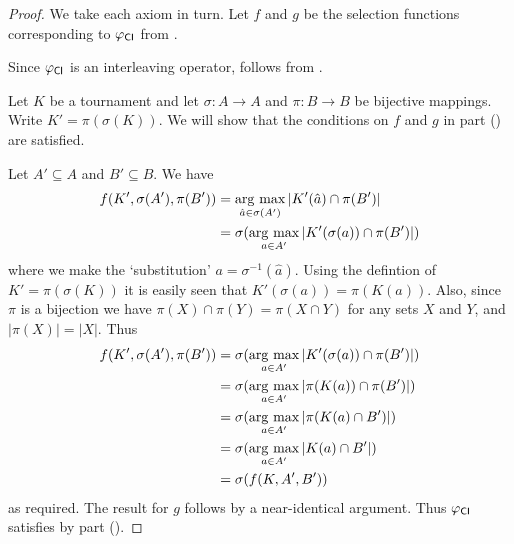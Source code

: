 \begin{proof}

    We take each axiom in turn. Let $f$ and $g$ be the selection functions
    corresponding to ${\varphi_{\mathsf{CI}}}$ from .

     Since ${\varphi_{\mathsf{CI}}}$ is an interleaving operator,
     follows from .

     Let $K$ be a tournament and let $\sigma: A \to A$ and $\pi:
    B \to B$ be bijective mappings. Write $K' = \pi(\sigma(K))$. We will show
    that the conditions on $f$ and $g$ in
     part
    () are satisfied.

    Let $A' \subseteq A$ and $B' \subseteq B$. We have
    \begin{align*}
        f(K', \sigma(A'), \pi(B'))
        &= \operatorname*{arg\ max}_{\hat{a} \in \sigma(A')}{|K'(\hat{a}) \cap \pi(B')|} \\
        &= \sigma(\operatorname*{arg\ max}_{a \in A'}{|K'(\sigma(a)) \cap \pi(B')|})
    \end{align*}
    where we make the `substitution' $a = \sigma^{-1}(\hat{a})$. Using the
    defintion of $K' = \pi(\sigma(K))$ it is easily seen that $K'(\sigma(a)) =
    \pi(K(a))$. Also, since $\pi$ is a bijection we have $\pi(X) \cap \pi(Y) =
    \pi(X \cap Y)$ for any sets $X$ and $Y$, and $|\pi(X)| = |X|$. Thus
    \begin{align*}
        f(K', \sigma(A'), \pi(B'))
        &= \sigma(\operatorname*{arg\ max}_{a \in A'}{|K'(\sigma(a)) \cap \pi(B')|}) \\
        &= \sigma(\operatorname*{arg\ max}_{a \in A'}{|\pi(K(a)) \cap \pi(B')|}) \\
        &= \sigma(\operatorname*{arg\ max}_{a \in A'}{|\pi(K(a) \cap B')|}) \\
        &= \sigma(\operatorname*{arg\ max}_{a \in A'}{|K(a) \cap B'|}) \\
        &= \sigma(f(K, A', B'))
    \end{align*}
    as required. The result for $g$ follows by a near-identical argument. Thus
    ${\varphi_{\mathsf{CI}}}$ satisfies  by
     part
    ().


\end{proof}
